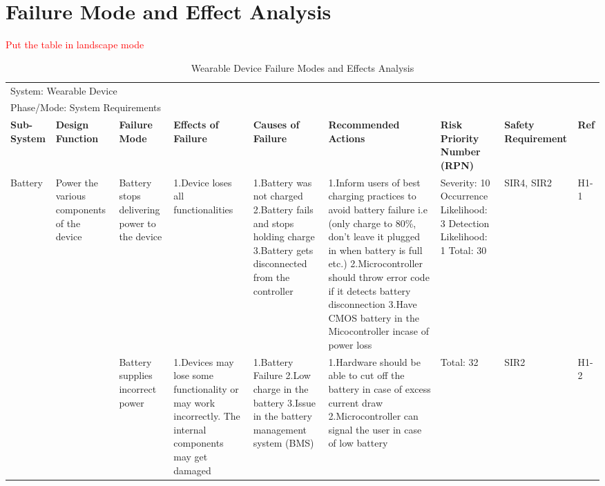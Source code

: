 \documentclass{article}
\begin{document}
\section{Failure Mode and Effect Analysis}
\textcolor{red}{Put the table in landscape mode}
\hspace*{-1cm}
\begin{landscape}
\begin{table}[H]
\centering
    \caption{Wearable Device Failure Modes and Effects Analysis}
    \tiny	
    \hspace*{-2.2cm}
    \begin{tabular}{| p{} | p{}  | p{} | p{} | p{} | p{} | p{} | p{} | p{} |}
    \hline
    
    \multicolumn{9}{|l|}{System: Wearable Device} \\
    \multicolumn{9}{|l|}{Phase/Mode: System Requirements} \\ \hline
    \textbf{Sub-System} & \textbf{Design Function} & \textbf{Failure Mode} & \textbf{Effects of Failure} & \textbf{Causes of Failure} & \textbf{Recommended Actions} & \textbf{Risk Priority Number (RPN)} & \textbf{Safety Requirement} & \textbf{Ref} \\ \hline

    Battery & Power the various components of the device  & Battery stops delivering power to the device & 1.Device loses all functionalities & 1.Battery was not charged \newline 2.Battery fails and stops holding charge \newline 3.Battery gets disconnected from the controller & 1.Inform users of best charging practices to avoid battery failure i.e (only charge to 80\%, don't leave it plugged in when battery is full etc.) \newline 2.Microcontroller should throw error code if it detects battery disconnection \newline 3.Have CMOS battery in the Micocontroller incase of power loss & Severity: 10 \newline Occurrence Likelihood: 3 \newline Detection Likelihood: 1 \newline Total: 30 & SIR4, SIR2 & H1-1 \\ \cline{3-9}
    
     & & Battery supplies incorrect power & 1.Devices may lose some functionality or may work incorrectly. The internal components may get damaged & 1.Battery Failure \newline 2.Low charge in the battery \newline 3.Issue in the battery management system (BMS) & 1.Hardware should be able to cut off the battery in case of excess current draw \newline 2.Microcontroller can signal the user in case of low battery & Total: 32 & SIR2 & H1-2 \\ \cline{3-9}


\end{tabular}
\end{table}
\end{landscape}
\end{document}
